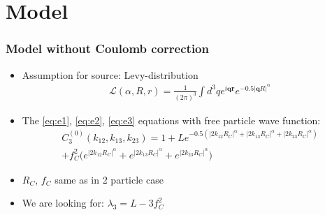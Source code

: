 \documentclass{beamer}
\begin{document}
\section{Model}
\begin{frame}
\frametitle{Model without Coulomb correction}
\begin{itemize}
\setlength{\itemsep}{16pt}
\item Assumption for source: Levy-distribution
\begin{align}
\mathcal{L}(\alpha, R, r) = \frac{1}{(2\pi)^3}\int d^3 q e^{i\bm{q}\bm{r}}e^{-0.5|\bm{q} R|^\alpha}
\end{align}
\item The \ref{eq:e1}, \ref{eq:e2}, \ref{eq:e3} equations with free particle wave function:
\begin{align}
C_3^{(0)}(k_{12}, k_{13}, k_{23}) = 1+ Le^{-0.5(|2k_{12}R_C|^\alpha+|2k_{13}R_C|^\alpha+|2k_{23}R_C|^\alpha)}\nonumber\\
+f_C^2\bigg(e^{|2k_{12}R_C|^\alpha}+e^{|2k_{13}R_C|^\alpha}+e^{|2k_{23}R_C|^\alpha}\bigg)
\end{align}
\item $R_C$, $f_C$ same as in 2 particle case
\item We are looking for: $\lambda_3=L-3f_C^2$
\end{itemize}
\end{frame}
\end{document}
